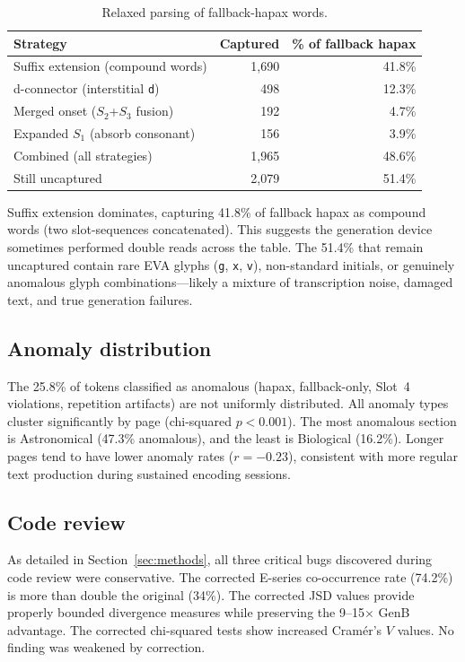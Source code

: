 \documentclass[12pt]{article}
\begin{document}
\begin{table}[ht]
\centering
\caption{Relaxed parsing of fallback-hapax words.}
\label{tab:relaxed}
\begin{tabular}{lrr}
\toprule
Strategy & Captured & \% of fallback hapax \\
\midrule
Suffix extension (compound words) & 1{,}690 & 41.8\% \\
d-connector (interstitial \texttt{d})      & 498    & 12.3\% \\
Merged onset ($S_2$+$S_3$ fusion)    & 192    & 4.7\% \\
Expanded $S_1$ (absorb consonant) & 156    & 3.9\% \\
\midrule
Combined (all strategies)          & 1{,}965 & 48.6\% \\
Still uncaptured                   & 2{,}079 & 51.4\% \\
\bottomrule
\end{tabular}
\end{table}

Suffix extension dominates, capturing 41.8\% of fallback hapax as compound words (two slot-sequences concatenated). This suggests the generation device sometimes performed double reads across the table. The 51.4\% that remain uncaptured contain rare EVA glyphs (\texttt{g}, \texttt{x}, \texttt{v}), non-standard initials, or genuinely anomalous glyph combinations---likely a mixture of transcription noise, damaged text, and true generation failures.

\subsection{Anomaly distribution}

The 25.8\% of tokens classified as anomalous (hapax, fallback-only, Slot~4 violations, repetition artifacts) are not uniformly distributed. All anomaly types cluster significantly by page (chi-squared $p < 0.001$). The most anomalous section is Astronomical (47.3\% anomalous), and the least is Biological (16.2\%). Longer pages tend to have lower anomaly rates ($r = -0.23$), consistent with more regular text production during sustained encoding sessions.

\subsection{Code review}

As detailed in Section~\ref{sec:methods}, all three critical bugs discovered during code review were conservative. The corrected E-series co-occurrence rate (74.2\%) is more than double the original (34\%). The corrected JSD values provide properly bounded divergence measures while preserving the 9--15$\times$ GenB advantage. The corrected chi-squared tests show increased Cram\'{e}r's $V$ values. No finding was weakened by correction.
\end{document}
